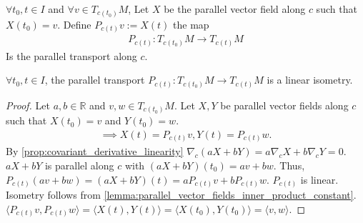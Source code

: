 \begin{definition}
    $\forall t_0, t \in I$ and $\forall v \in T_{c(t_0)}M$, Let $X$ be the parallel vector field along $c$ such that $X(t_0) = v$.
    Define $P_{c(t)}v:= X(t)$ the map 
    \[\begin{aligned}
        P_{c(t)} : T_{c(t_0)}M \to T_{c(t)}M
    \end{aligned}\]
    Is the parallel transport along $c$.
\end{definition}
\begin{proposition}
    $\forall t_0,t \in I$, the parallel transport $P_{c(t)}: T_{c(t_0)}M \to T_{c(t)}M$ is a linear isometry.
    \label{prop:parallel_transport_isometry}
\end{proposition}
\begin{proof}
    Let $a,b \in \mathbb{R}$ and $v,w \in T_{c(t_0)}M$. Let $X,Y$ be parallel vector fields along $c$ such that $X(t_0) = v$ and $Y(t_0) = w$. 
    \[
    \begin{aligned}
        \implies X(t) = P_{c(t)}v, Y(t) = P_{c(t)}w.
    \end{aligned}
    \]
    By \autoref{prop:covariant_derivative_linearity} $\nabla_c(aX + bY) = a\nabla_cX + b\nabla_cY = 0$.
    $aX+bY$ is parallel along $c$ with $(aX+bY)(t_0) = av + bw$.
    Thus, $P_{c(t)}(av + bw) = (aX + bY)(t) = aP_{c(t)}v + bP_{c(t)}w$. $P_{c(t)}$ is linear.
    Isometry follows from \autoref{lemma:parallel_vector_fields_inner_product_constant}.
    $\langle P_{c(t)}v, P_{c(t)}w \rangle = \langle X(t), Y(t) \rangle = \langle X(t_0), Y(t_0) \rangle = \langle v, w \rangle$.
\end{proof}

